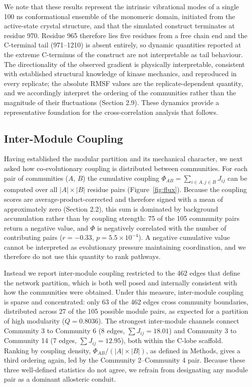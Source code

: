 \documentclass[utf8]{FrontiersinHarvard}
\begin{document}
We note that these results represent the intrinsic vibrational modes of a single 100 ns conformational ensemble of the monomeric domain, initiated from the active-state crystal structure, and that the simulated construct terminates at residue 970. Residue 965 therefore lies five residues from a free chain end and the C-terminal tail (971--1210) is absent entirely, so dynamic quantities reported at the extreme C-terminus of the construct are not interpretable as tail behaviour. The directionality of the observed gradient is physically interpretable, consistent with established structural knowledge of kinase mechanics, and reproduced in every replicate; the absolute RMSF values are the replicate-dependent quantity, and we accordingly interpret the ordering of the communities rather than the magnitude of their fluctuations (Section 2.9). These dynamics provide a representative foundation for the cross-correlation analysis that follows.

\subsection{Inter-Module Coupling}
\label{sec:flux}

Having established the modular partition and its mechanical character, we next asked how co-evolutionary coupling is distributed between communities. For each pair of communities ($A$, $B$) the cumulative coupling $\Phi_{AB} = \sum_{i \in A, j \in B} J_{ij}$ can be computed over all $|A| \times |B|$ residue pairs (Figure~\ref{fig:flux}). Because the coupling scores are average-product-corrected and therefore signed with a mean of approximately zero (Section 2.2), this sum is dominated by background accumulation rather than by coupling strength: 75 of the 105 community pairs return a negative value, and $\Phi$ is negatively correlated with the number of contributing pairs ($r = -0.33$, $p = 5.5 \times 10^{-4}$). A negative cumulative value cannot be interpreted as evolutionary pressure maintaining coordination, and we therefore do not use this quantity to rank pathways.

Instead we report inter-module coupling restricted to the 462 edges that define the network partition, which is both well posed and internally consistent with how the communities were obtained. Under this measure, inter-module coupling is sparse and concentrated: only 63 of the 462 edges cross community boundaries, distributed across 27 of the 105 possible module pairs, as expected for a partition of high modularity ($Q = 0.8036$). The strongest inter-module channels connect Community 3 to Community 6 (8 edges, $\sum J_{ij} = 18.01$) and Community 3 to Community 14 (7 edges, $\sum J_{ij} = 12.95$), both within the C-lobe scaffold. Ranking by coupling density, $\Phi_{AB}/(|A| \times |B|)$, as defined in Methods, gives a third ordering again, led by the Community 2--Community 4 pair. Because these three well-defined statistics do not agree, we refrain from designating any module pair as a dominant allosteric conduit.
\end{document}
